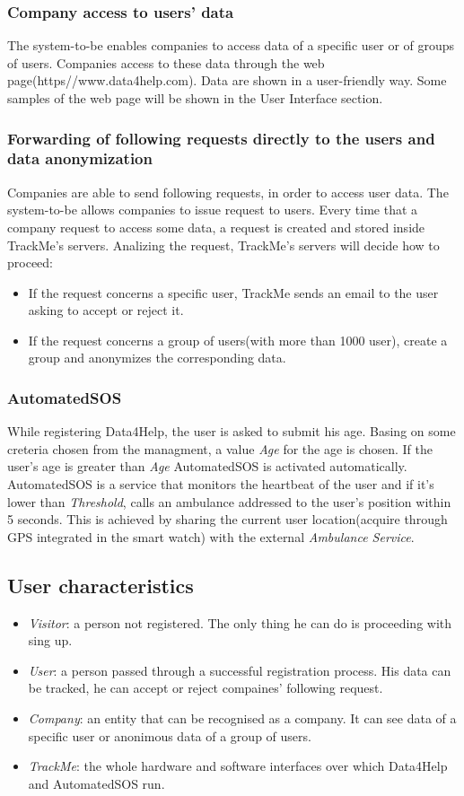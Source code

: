 \documentclass{article}
\begin{document}
\subsubsection{Company access to users' data}
The system-to-be enables companies to access data of a specific user or of groups of users. Companies access to these data through the web page(https//www.data4help.com). Data are shown in a user-friendly way. Some samples of the web page will be shown in the User Interface section.
\subsubsection{Forwarding of following requests directly to the users and data anonymization}
Companies are able to send following requests, in order to access user data. The system-to-be allows companies to issue request to users. Every time that a company request to access some data, a request is created and stored inside TrackMe's servers. Analizing the request, TrackMe's servers will decide how to proceed:\\
\begin{itemize}
\item If the request concerns a specific user, TrackMe sends an email to the user asking to accept or reject it.
\item If the request concerns a group of users(with more than 1000 user), create a group and anonymizes the corresponding data. 
\end{itemize}
\subsubsection{AutomatedSOS}
While registering Data4Help, the user is asked to submit his age. Basing on some creteria chosen from the managment, a value \emph{Age} for the age is chosen. If the user's age is greater than \emph{Age} AutomatedSOS is activated automatically. AutomatedSOS is a service that monitors the heartbeat of the user and if it's lower than \emph{Threshold}, calls an ambulance addressed to the user's position within 5 seconds. This is achieved by sharing the current user location(acquire through GPS integrated in the smart watch) with the external \emph{Ambulance Service}.
\subsection{User characteristics}
\begin{itemize}
\item \emph{Visitor}: a person not registered. The only thing he can do is proceeding with sing up.
\item \emph{User}: a person passed through a successful registration process. His data can be tracked, he can accept or reject compaines' following request.
 \item \emph{Company}: an entity that can be recognised as a company. It can see data of a specific user or anonimous data of a group of users. 
 \item \emph{TrackMe}: the whole hardware and software interfaces over which Data4Help and AutomatedSOS run.
\end{itemize}
\end{document}
